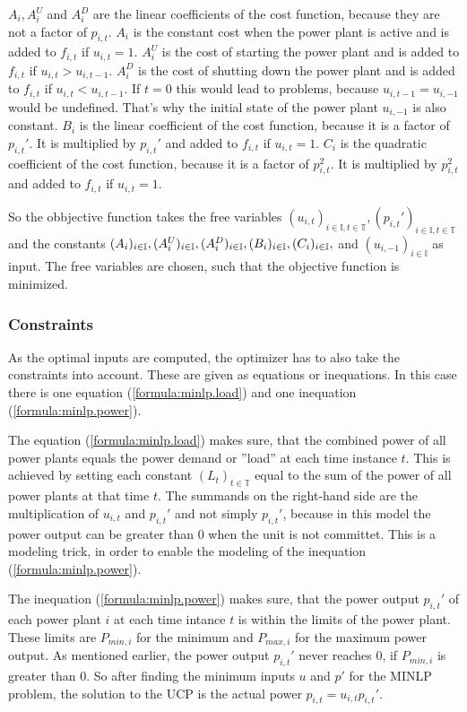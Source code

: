 $A_i, A_i^U$ and $A_i^D$ are the linear coefficients of the cost function,
because they are not a factor of $p_{i, t}$.
$A_i$ is the constant cost when the power plant is active
and is added to $f_{i, t}$ if $u_{i, t} = 1$.
$A_i^U$ is the cost of starting the power plant
and is added to $f_{i, t}$ if $u_{i, t} > u_{i, t-1}$.
$A_i^D$ is the cost of shutting down the power plant
and is added to $f_{i, t}$ if $u_{i, t} < u_{i, t-1}$.
If $t = 0$ this would lead to problems, because $u_{i, t-1} = u_{i, -1}$ would be undefined.
That's why the initial state of the power plant $u_{i, -1}$ is also constant.
$B_i$ is the linear coefficient of the cost function,
because it is a factor of $p_{i, t}'$.
It is multiplied by $p_{i, t}'$ and added to $f_{i, t}$ if $u_{i,  t} = 1$.
$C_i$ is the quadratic coefficient of the cost function,
because it is a factor of $p_{i, t}^2$.
It is multiplied by $p_{i, t}^2$ and added to $f_{i, t}$ if $u_{i,  t} = 1$.

So the obbjective function takes the free variables
$
(u_{i, t})_{i \in \mathbb{I}, t \in \mathbb{T}},
(p_{i, t}')_{i \in \mathbb{I}, t \in \mathbb{T}}
$ and the constants $
(A_i)_{i \in \mathbb{I}}, \\
(A_i^U)_{i \in \mathbb{I}},
(A_i^D)_{i \in \mathbb{I}},
(B_i)_{i \in \mathbb{I}},
(C_i)_{i \in \mathbb{I}},
$ and $
(u_{i, -1})_{i \in \mathbb{I}}
$ as input.
The free variables are chosen, such that the objective function is minimized.

\subsubsection{Constraints}

As the optimal inputs are computed, the optimizer has to also take the constraints into account.
These are given as equations or inequations.
In this case there is one equation (\ref{formula:minlp.load}) and one inequation (\ref{formula:minlp.power}).

The equation (\ref{formula:minlp.load}) makes sure, that the combined power
of all power plants equals the power demand or ''load'' at each time instance $t$.
This is achieved by setting each constant $(L_t)_{t \in \mathbb{T}}$
equal to the sum of the power of all power plants at that time $t$.
The summands on the right-hand side are the multiplication of
$u_{i, t}$ and $p_{i, t}'$ and not simply $p_{i, t}'$,
because in this model the power output can be greater than 0
when the unit is not committet.
This is a modeling trick, in order to enable the modeling of the inequation (\ref{formula:minlp.power}).

The inequation (\ref{formula:minlp.power}) makes sure, that the power output $p_{i, t}'$
of each power plant $i$ at each time intance $t$ is within the limits of the power plant.
These limits are $P_{min, i}$ for the minimum and $P_{max, i}$ for the maximum
power output.
As mentioned earlier, the power output $p_{i, t}'$ never reaches 0,
if $P_{min, i}$ is greater than 0.
So after finding the minimum inputs $u$ and $p'$ for the MINLP problem,
the solution to the UCP is the actual power $p_{i, t} = u_{i, t} p_{i, t}'$.
